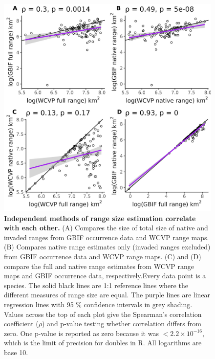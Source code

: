 \documentclass[12pt]{article}
\begin{document}
\begin{figure}[H]
    \centering
    \includegraphics[width=\textwidth]{figures/appendix_d/wcvp_vs_gbif_2024-12-12.jpg}
    \caption{\textbf{Independent methods of range size estimation correlate with each other.} (A) Compares the size of total size of native and invaded ranges from GBIF occurrence data and WCVP range maps. (B) Compares native range estimates only (invaded ranges excluded) from GBIF occurrence data and WCVP range maps. (C) and (D) compare the full and native range estimates from WCVP range maps and GBIF occurrence data, respectively.Every data point is a species. The solid black lines are 1:1 reference lines where the different measures of range size are equal. The purple lines are linear regression lines with 95 \% confidence intervals in grey shading. Values across the top of each plot give the Spearman's correlation coefficient ($\rho$) and p-value testing whether correlation differs from zero. One p-value is reported as zero because it was $<2.2\times10^{-16}$, which is the limit of precision for doubles in R. All logarithms are base 10.}
\end{figure}
\end{document}
